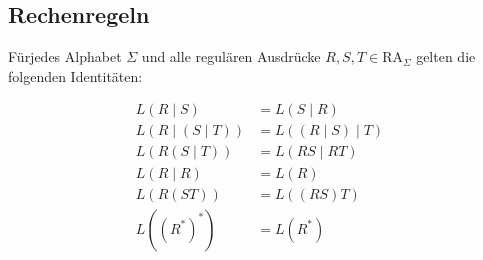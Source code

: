 \subsection{Rechenregeln}

Fürjedes Alphabet \(\Sigma\) und alle regulären Ausdrücke \(R,S,T \in \text{RA}_\Sigma\) gelten die folgenden Identitäten:

\begin{align*}
    L(R \mid S)          & = L(S \mid R)          \\
    L(R \mid (S \mid T)) & = L((R \mid S) \mid T) \\
    L(R(S \mid T))       & = L(RS \mid RT)        \\
    L(R \mid R)          & = L(R)                 \\
    L(R(ST))             & = L((RS)T)             \\
    L((R^*)^*)           & = L(R^*)
\end{align*}
